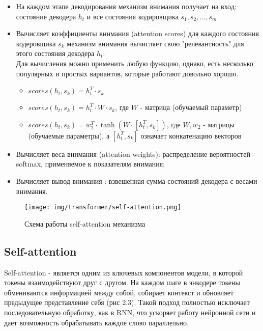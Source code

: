 \documentclass[PMI,KR]{HSEUniversity}
\begin{document}
\begin{itemize}
    \item На каждом этапе декодирования механизм внимания получает на вход: состояние декодера $h_t$ и все состояния кодировщика $s_1, s_2, \dots, s_m$ 
    \item Вычисляет коэффициенты внимания (attention scores) для каждого состояния кодеровщика $s_k$ механизм внимания вычисляет свою "релевантность" для этого состояния декодера $h_t$. \\
    Для вычисления можно применить любую функцию, однако, есть несколько популярных и простых вариантов, которые работают довольно хорошо.
    \begin{itemize}
        \item $scores(h_t, s_k) = h_t^T \cdot s_k $
        \item $scores(h_t, s_k) = h_t^T \cdot W \cdot s_k $, где $W$ - матрица (обучаемый параметр)
        \item $scores(h_t, s_k) = w_2^T \cdot \tanh(W \cdot [h_t^T, s_k]) $, где $W, w_2$ - матрицы (обучаемые параметры), а $[h_t^T, s_k]$ означает конкатенацию векторов 
    \end{itemize}

    \item Вычисляет веса внимания (attention weights): распределение вероятностей - softmax, применяемое к показателям внимания;
    \item Вычисляет вывод внимания : взвешенная сумма состояний декодера с весами внимания.
\end{itemize}

\begin{figure}[h]
    \centering
    \texttt{[image: img/transformer/self-attention.png]}
    \caption{Схема работы self-attention механизма}
\end{figure}

\subsection{Self-attention}

 Self-attention - является одним из ключевых компонентов модели, в которой токены взаимодействуют друг с другом. На каждом шаге в энкодере токены обмениваются информацией между собой, собирает контекст и обновляет предыдущее представление себя (рис 2.3). Такой подход полностью исключает последовательную обработку, как в RNN, что ускоряет работу нейронной сети и дает возможность обрабатывать каждое слово параллельно.
\end{document}
